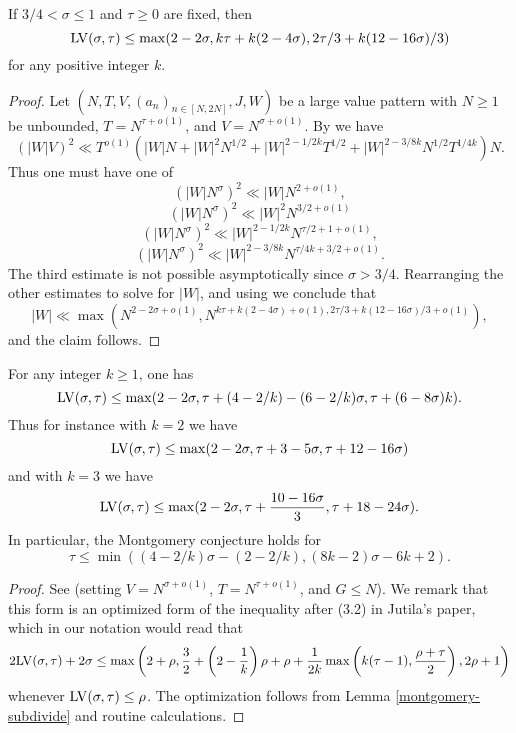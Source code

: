 \begin{lemma}\label{hb-lvt-2} If $3/4 < \sigma \leq 1$ and $\tau \geq 0$ are fixed, then
    $$ \mathrm{LV}(\sigma,\tau) \leq \max( 2-2\sigma, k\tau + k(2-4\sigma), 2\tau/3 + k(12-16\sigma)/3 )$$
    for any positive integer $k$.
    \end{lemma}

\begin{proof} Let $(N,T,V,(a_n)_{n \in [N,2N]},J,W)$ be a large value pattern with $N \geq 1$ be unbounded, $T = N^{\tau + o(1)}$, and $V = N^{\sigma + o(1)}$. By \cite[Lemma~6]{heathbrown_large_1979} we have
    $$ (|W| V)^2 \ll T^{o(1)}( |W|N + |W|^2 N^{1/2} + |W|^{2-1/2k} T^{1/2} + |W|^{2-3/8k} N^{1/2} T^{1/4k}) N.$$
    Thus one must have one of
$$ (|W| N^\sigma)^2 \ll |W|N^{2+o(1)},$$
$$ (|W| N^\sigma)^2 \ll |W|^2 N^{3/2+o(1)}$$
$$ (|W| N^\sigma)^2 \ll |W|^{2-1/2k} N^{\tau/2+1+o(1)},$$
$$ (|W| N^\sigma)^2 \ll |W|^{2-3/8k} N^{\tau/4k + 3/2+ o(1)}.$$
The third estimate is not possible asymptotically since $\sigma > 3/4$.  Rearranging the other estimates to solve for $|W|$, and using we conclude that
$$ |W| \ll \max\left( N^{2-2\sigma+o(1)}, N^{k\tau + k(2-4\sigma)+o(1), 2\tau/3 + k(12-16\sigma)/3 + o(1)}\right),$$
and the claim follows.
\end{proof}

\begin{theorem}\label{jutila-lvt}  For any integer $k \geq 1$, one has
$$ \mathrm{LV}(\sigma,\tau) \leq \max(2-2\sigma, \tau + (4-2/k) - (6-2/k)\sigma, \tau + (6-8\sigma)k).$$
Thus for instance with $k=2$ we have
$$ \mathrm{LV}(\sigma,\tau) \leq \max(2-2\sigma, \tau + 3 - 5\sigma, \tau + 12-16\sigma)$$
and with $k=3$ we have
$$ \mathrm{LV}(\sigma,\tau) \leq \max(2-2\sigma, \tau + \frac{10-16\sigma}{3}, \tau + 18-24\sigma).$$
In particular, the Montgomery conjecture holds for
$$ \tau \leq \min( (4-2/k)\sigma - (2-2/k), (8k-2)\sigma - 6k + 2).$$
\end{theorem}

\begin{proof} See \cite[(1.4)]{jutila_zero_density_1977} (setting $V = N^{\sigma+o(1)}$, $T = N^{\tau+o(1)}$, and $G \leq N$).  We remark that this form is an optimized form of the inequality after (3.2) in Jutila's paper, which in our notation would read that
$$ 2\mathrm{LV}(\sigma,\tau) + 2\sigma \leq \max \left(2 + \rho, \frac{3}{2} + \left(2 - \frac{1}{k}\right)\rho + \rho + \frac{1}{2k}\max\left(k(\tau-1), \frac{\rho+\tau}{2}\right), 2\rho + 1\right)$$
whenever $\mathrm{LV}(\sigma,\tau) \leq \rho$.  The optimization follows from Lemma \ref{montgomery-subdivide} and routine calculations.
\end{proof}

